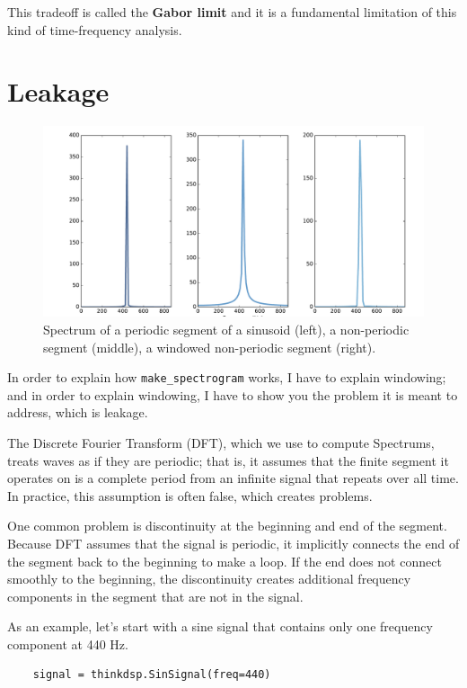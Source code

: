 \documentclass[12pt]{book}
\begin{document}
This tradeoff is called the {\bf Gabor limit} and it is a fundamental
limitation of this kind of time-frequency analysis.


\section{Leakage}

\begin{figure}
\centerline{\includegraphics[width=5.5in]{figs/windowing1.pdf}}
\caption{Spectrum of a periodic segment of a sinusoid (left), a
  non-periodic segment (middle), a windowed non-periodic segment
  (right).}
\label{fig.windowing1}
\end{figure}

In order to explain how \verb"make_spectrogram" works, I have
to explain windowing; and in order to explain windowing, I have to
show you the problem it is meant to address, which is leakage.

The Discrete Fourier Transform (DFT), which we use to compute
Spectrums, treats waves as if they are periodic; that is, it assumes
that the finite segment it operates on is a complete period from an
infinite signal that repeats over all time.  In practice, this
assumption is often false, which creates problems.

One common problem is discontinuity at the beginning and end of the
segment.  Because DFT assumes that the signal is periodic, it
implicitly connects the end of the segment back to the beginning to
make a loop.  If the end does not connect smoothly to the beginning,
the discontinuity creates additional frequency components in the
segment that are not in the signal.

As an example, let's start with a sine signal that contains only
one frequency component at 440 Hz.

\begin{verbatim}
    signal = thinkdsp.SinSignal(freq=440)
\end{verbatim}
\end{document}
